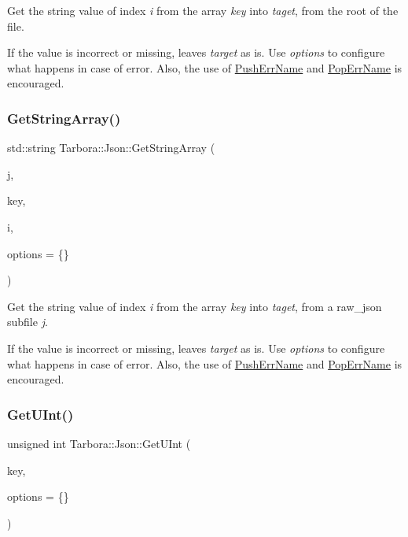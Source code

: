 Get the string value of index {\itshape i} from the array {\itshape key} into {\itshape taget}, from the root of the file. 

If the value is incorrect or missing, leaves {\itshape target} as is. Use {\itshape options} to configure what happens in case of error. Also, the use of \hyperlink{classTarbora_1_1Json_a061eac4f16dac3b9b3a26a66de0ea8f0}{Push\+Err\+Name} and \hyperlink{classTarbora_1_1Json_a14019f06d3bd76edd6a6e78134519d11}{Pop\+Err\+Name} is encouraged. \mbox{\label{classTarbora_1_1Json_a3c9931f8a801c8e3ac93d645f34aed79}} 
\subsubsection{\texorpdfstring{Get\+String\+Array()}{GetStringArray()}\hspace{0.1cm}{\footnotesize\ttfamily [2/2]}}
{\footnotesize\ttfamily std\+::string Tarbora\+::\+Json\+::\+Get\+String\+Array (\begin{DoxyParamCaption}\item[{raw\+\_\+json}]{j,  }\item[{const char $\ast$}]{key,  }\item[{int}]{i,  }\item[{\hyperlink{structTarbora_1_1JsonOptions}{Json\+Options}}]{options = {\ttfamily \{\}} }\end{DoxyParamCaption})}



Get the string value of index {\itshape i} from the array {\itshape key} into {\itshape taget}, from a raw\+\_\+json subfile {\itshape j}. 

If the value is incorrect or missing, leaves {\itshape target} as is. Use {\itshape options} to configure what happens in case of error. Also, the use of \hyperlink{classTarbora_1_1Json_a061eac4f16dac3b9b3a26a66de0ea8f0}{Push\+Err\+Name} and \hyperlink{classTarbora_1_1Json_a14019f06d3bd76edd6a6e78134519d11}{Pop\+Err\+Name} is encouraged. \mbox{\label{classTarbora_1_1Json_a875c7af2f8461cd1c05c68b683610c4f}} 
\subsubsection{\texorpdfstring{Get\+U\+Int()}{GetUInt()}\hspace{0.1cm}{\footnotesize\ttfamily [1/3]}}
{\footnotesize\ttfamily unsigned int Tarbora\+::\+Json\+::\+Get\+U\+Int (\begin{DoxyParamCaption}\item[{const char $\ast$}]{key,  }\item[{\hyperlink{structTarbora_1_1JsonOptions}{Json\+Options}}]{options = {\ttfamily \{\}} }\end{DoxyParamCaption})}



